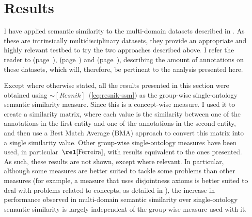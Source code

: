 \section{Results} \label{sec:multidomain/results}

I have applied semantic similarity to the multi-domain datasets described in . As these are intrinsically multidisciplinary datasets, they provide an appropriate and highly relevant testbed to try the two approaches described above. I refer the reader to  (page~\pageref{tab:epiwork-summary}),  (page~\pageref{tab:pathways-summary}) and  (page~\pageref{tab:biomodels-summary}), describing the amount of annotations on these datasets, which will, therefore, be pertinent to the analysis presented here.

Except where otherwise stated, all the results presented in this section were obtained using $\sim[Resnik]$~(\eqref{eq:resnik-ssm}) as the group-wise single-ontology semantic similarity measure. Since this is a concept-wise measure, I used it to create a similarity matrix, where each value is the similarity between one of the annotations in the first entity and one of the annotations in the second entity, and then use a Best Match Average (BMA) approach to convert this matrix into a single similarity value. Other group-wise single-ontology measures have been used, in particular~$\ferreira$, with results equivalent to the ones presented. As such, these results are not shown, except where relevant. In particular, although some measures are better suited to tackle some problems than other measures (for example, a measure that uses disjointness axioms is better suited to deal with problems related to  concepts, as detailed in ), the increase in performance observed in multi-domain semantic similarity over single-ontology semantic similarity is largely independent of the group-wise measure used with it.

